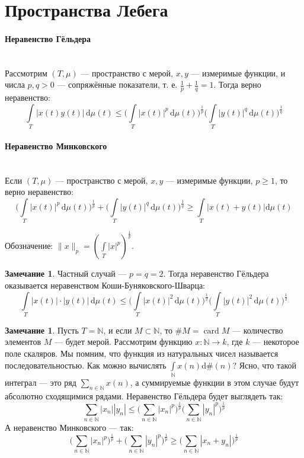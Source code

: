 \documentclass[11pt,openany,a4paper]{scrartcl}
\theoremstyle{plain}
\theoremstyle{definition}
\newtheorem{remark}[theorem]{Замечание}
\newcommand\mb{\mathbb}
\newcommand\lparagraph[1]{\paragraph{#1}\mbox{}\\}
\newcommand{\dif}{\, \mathrm d}
\DeclareMathOperator{\card}{card}
\begin{document}
\section{Пространства Лебега}

\lparagraph{Неравенство Гёльдера}

Рассмотрим $(T, \mu)$ — пространство с мерой, $x, y$ — измеримые функции, и числа
$p, q > 0$ — сопряжённые показатели, т. е. $\frac{1}{p} + \frac{1}{q} = 1$. 
Тогда верно неравенство:
$$
\int\limits_T |x(t)y(t)|\dif \mu(t) \leqslant
\bigg(\int\limits_T |x(t)|^p\dif \mu(t)\bigg)^{\frac{1}{p}}
\bigg(\int\limits_T |y(t)|^q\dif \mu(t)\bigg)^\frac{1}{q}
$$

\lparagraph{Неравенство Минковского}

Если $(T, \mu)$ — пространство с мерой, $x, y$ — измеримые функции,
$p \geqslant 1$, то верно неравенство:
$$
\bigg(\int\limits_T |x(t)|^p\dif \mu(t)\bigg)^{\frac{1}{p}} +
\bigg(\int\limits_T |y(t)|^q\dif \mu(t)\bigg)^\frac{1}{q} \geqslant
\int\limits_T |x(t) + y(t)|\mathrm d\mu(t)
$$

Обозначение: $\|x\|_p = (\int\limits_T |x|^p)^\frac{1}{p}$.

\begin{remark}
    Частный случай — $p = q = 2$. Тогда неравенство Гёльдера оказывается
    неравенством Коши-Буняковского-Шварца:
    $$
    \int\limits_T |x(t)|\cdot|y(t)|\dif \mu(t) \leqslant
    \bigg(\int\limits_T |x(t)|^2\dif \mu(t)\bigg)^{\frac{1}{2}}
    \bigg(\int\limits_T |y(t)|^2\dif\mu(t)\bigg)^\frac{1}{2}
    $$
\end{remark}
\begin{remark}
    Пусть $T = \mb N$, и если $M \subset \mb N$,
    то $\#M = \card M$ — количество элементов $M$ — будет мерой.
    Рассмотрим функцию $x: \mb N \to k$, где $k$ — некоторое поле скаляров.
    Мы помним, что функция из натуральных чисел называется последовательностью.
    Как можно вычислять $\int\limits_{\mb N}x(n)\mathrm d\#(n)$? Ясно,
    что такой интеграл — это ряд $\sum\limits_{n \in \mb N} x(n)$, а суммируемые 
    функции в этом случае будут абсолютно сходящимися рядами.
    Неравенство Гёльдера будет выглядеть так:
    $$
    \sum_{n \in \mb N} |x_n||y_n| \leqslant
    \bigg(\sum_{n \in \mb N} |x_n|^p\bigg)^\frac{1}{p}
    \bigg(\sum_{n \in \mb N} |y_n|^p\bigg)^\frac{1}{p}
    $$
    А неравенство Минковского — так:
    $$
    \bigg(\sum_{n \in \mb N} |x_n|^p\bigg)^\frac{1}{p} +
    \bigg(\sum_{n \in \mb N} |y_n|^p\bigg)^\frac{1}{p} \geqslant
    \bigg(\sum_{n \in \mb N} |x_n + y_n|\bigg)^\frac{1}{p}
    $$
\end{remark}
\end{document}
